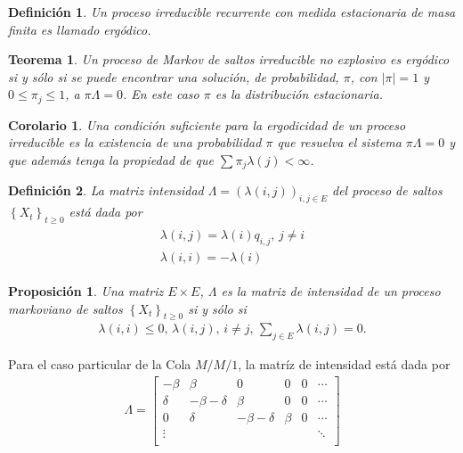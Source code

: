\documentclass{article}
\newtheorem{Def}{Definición}[section]
\newtheorem{Teo}{Teorema}[section]
\newtheorem{Prop}{Proposición}[section]
\newtheorem{Cor}{Corolario}[section]
\numberwithin{equation}{section}
\begin{document}
\begin{Def}
Un proceso irreducible recurrente con medida estacionaria de masa finita es llamado erg\'odico.
\end{Def}

\begin{Teo}\label{Teo.4.3}
Un proceso de Markov de saltos irreducible no explosivo es erg\'odico si y s\'olo si se puede encontrar una soluci\'on, de probabilidad, $\pi$, con $|\pi|=1$ y $0\leq\pi_{j}\leq1$, a $\pi\Lambda=0$. En este caso $\pi$ es la distribuci\'on estacionaria.
\end{Teo}

\begin{Cor}\label{Cor.4.4}
Una condici\'on suficiente para la ergodicidad de un proceso irreducible es la existencia de una probabilidad $\pi$ que resuelva el sistema $\pi\Lambda=0$ y que adem\'as tenga la propiedad de que $\sum\pi_{j}\lambda\left(j\right)<\infty$.
\end{Cor}

\begin{Def}
La matriz intensidad $\Lambda=\left(\lambda\left(i,j\right)\right)_{i,j\in E}$ del proceso de saltos $\left\{X_{t}\right\}_{t\geq0}$ est\'a dada por
\begin{eqnarray}
\begin{array}{l}
\lambda\left(i,j\right)=\lambda\left(i\right)q_{i,j}\textrm{,    }j\neq i\\
\lambda\left(i,i\right)=-\lambda\left(i\right)
\end{array}
\end{eqnarray}
\end{Def}


\begin{Prop}\label{Prop.3.1}
Una matriz $E\times E$, $\Lambda$ es la matriz de intensidad de un proceso markoviano de saltos $\left\{X_{t}\right\}_{t\geq0}$ si y s\'olo si
\begin{eqnarray}
\lambda\left(i,i\right)\leq0\textrm{, }\lambda\left(i,j\right)\textrm{,   }i\neq j\textrm{,  }\sum_{j\in E}\lambda\left(i,j\right)=0.
\end{eqnarray}
\end{Prop}

Para el caso particular de la Cola $M/M/1$, la matr\'iz de intensidad est\'a dada por
\begin{eqnarray*}
\Lambda=\left[\begin{array}{cccccc}
-\beta & \beta & 0 &0 &0& \cdots\\
\delta & -\beta-\delta & \beta & 0 & 0 &\cdots\\
0 & \delta & -\beta-\delta & \beta & 0 &\cdots\\
\vdots & & & & & \ddots\\
\end{array}\right]
\end{eqnarray*}
\end{document}
